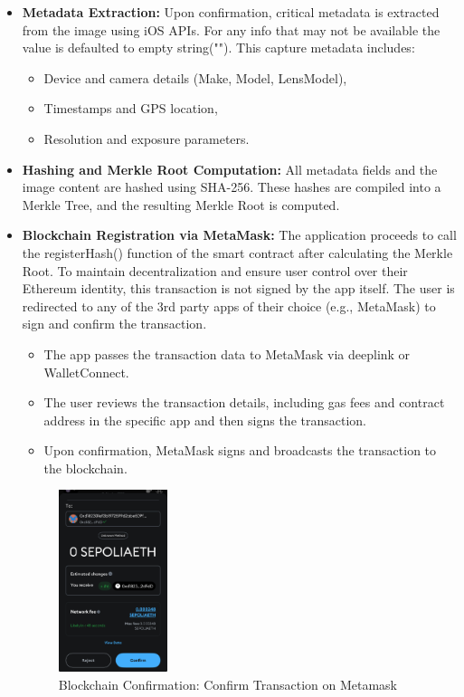 \begin{itemize}
    \item {\textbf{Metadata Extraction:}} Upon confirmation, critical metadata is extracted from the image using iOS APIs. For any info that may not be available the value is defaulted to empty string(""). This capture metadata includes:
    \begin{itemize}
        \item Device and camera details (Make, Model, LensModel),
        \item Timestamps and GPS location,
        \item Resolution and exposure parameters.
    \end{itemize}

    \item {\textbf{Hashing and Merkle Root Computation:}} All metadata fields and the image content are hashed using SHA-256. These hashes are compiled into a Merkle Tree, and the resulting Merkle Root is computed.
    
    \item {\textbf{Blockchain Registration via MetaMask:}} 
    The application proceeds to call the registerHash() function of the smart contract after calculating the Merkle Root. 
    To maintain decentralization and ensure user control over their Ethereum identity, this transaction is not signed by the app itself. 
    The user is redirected to any of the 3rd party apps of their choice (e.g., MetaMask) to sign and confirm the transaction.
    \begin{itemize}
        \item The app passes the transaction data to MetaMask via deeplink or WalletConnect.
        \item The user reviews the transaction details, including gas fees and contract address in the specific app and then signs the transaction.
        \item Upon confirmation, MetaMask signs and broadcasts the transaction to the blockchain.
    \end{itemize}

    \begin{figure}[H]
        \centering
        \includegraphics[width=0.30\textwidth]{images/blockchainConfirmation.jpeg}
        \caption{Blockchain Confirmation: Confirm Transaction on Metamask}
        \label{fig:blockchainConfirmation}
    \end{figure}


\end{itemize}
